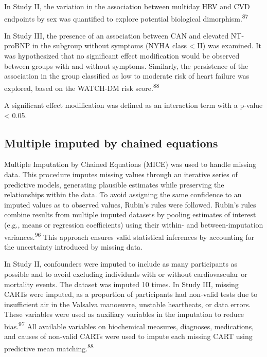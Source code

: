 \documentclass[
  a4paper,
  headsepline=true,
  open=left]{scrbook}
\begin{document}
In Study II, the variation in the association between multiday HRV and
CVD endpoints by sex was quantified to explore potential biological
dimorphism.\textsuperscript{87}

In Study III, the presence of an association between CAN and elevated
NT-proBNP in the subgroup without symptoms (NYHA class \textless{} II)
was examined. It was hypothesized that no significant effect
modification would be observed between groups with and without symptoms.
Similarly, the persistence of the association in the group classified as
low to moderate risk of heart failure was explored, based on the
WATCH-DM risk score.\textsuperscript{88}

A significant effect modification was defined as an interaction term
with a p-value \textless{} 0.05.

\hypertarget{multiple-imputed-by-chained-equations}{%
\subsection{Multiple imputed by chained
equations}\label{multiple-imputed-by-chained-equations}}

Multiple Imputation by Chained Equations (MICE) was used to handle
missing data. This procedure imputes missing values through an iterative
series of predictive models, generating plausible estimates while
preserving the relationships within the data. To avoid assigning the
same confidence to an imputed values as to observed values, Rubin's
rules were followed. Rubin's rules combine results from multiple imputed
datasets by pooling estimates of interest (e.g., means or regression
coefficients) using their within- and between-imputation
variances.\textsuperscript{96} This approach ensures valid statistical
inferences by accounting for the uncertainty introduced by missing data.

In Study II, confounders were imputed to include as many participants as
possible and to avoid excluding individuals with or without
cardiovascular or mortality events. The dataset was imputed 10 times. In
Study III, missing CARTs were imputed, as a proportion of participants
had non-valid tests due to insufficient air in the Valsalva manoeuvre,
unstable heartbeats, or data errors. These variables were used as
auxiliary variables in the imputation to reduce
bias.\textsuperscript{97} All available variables on biochemical
measures, diagnoses, medications, and causes of non-valid CARTs were
used to impute each missing CART using predictive mean
matching.\textsuperscript{88}
\end{document}
